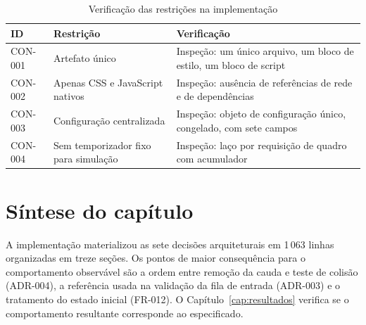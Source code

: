 \begin{table}[htb]
	\caption{Verificação das restrições na implementação}
	\label{tab:restricoes-verificacao}
	\centering
	\footnotesize
	\begin{tabularx}{\textwidth}{@{}p{1.7cm} X p{2.6cm}@{}}
		\toprule
		\textbf{ID} & \textbf{Restrição} & \textbf{Verificação} \\
		\midrule
		CON-001 & Artefato único & Inspeção: um único arquivo, um bloco de estilo, um bloco de script \\
		\addlinespace
		CON-002 & Apenas CSS e JavaScript nativos & Inspeção: ausência de referências de rede e de dependências \\
		\addlinespace
		CON-003 & Configuração centralizada & Inspeção: objeto de configuração único, congelado, com sete campos \\
		\addlinespace
		CON-004 & Sem temporizador fixo para simulação & Inspeção: laço por requisição de quadro com acumulador \\
		\bottomrule
	\end{tabularx}
\end{table}

\section{Síntese do capítulo}
\label{sec:impl-sintese}

A implementação materializou as sete decisões arquiteturais em 1\,063 linhas
organizadas em treze seções. Os pontos de maior consequência para o
comportamento observável são a ordem entre remoção da cauda e teste de colisão
(ADR-004), a referência usada na validação da fila de entrada (ADR-003) e o
tratamento do estado inicial (FR-012). O Capítulo~\ref{cap:resultados} verifica
se o comportamento resultante corresponde ao especificado.
